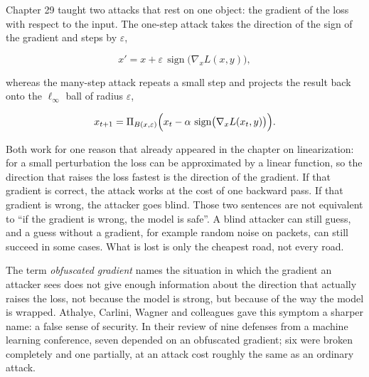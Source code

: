Chapter 29 taught two attacks that rest on one object: the gradient of the loss with respect to the
input. The one-step attack takes the direction of the sign of the gradient and steps by
$\varepsilon$,

\begin{equation}
x' = x + \varepsilon\,\operatorname{sign}\bigl(\nabla_x L(x,y)\bigr),
\end{equation}

whereas the many-step attack repeats a small step and projects the result back onto the
$\ell_\infty$ ball of radius $\varepsilon$,

\begin{equation}
x_{t+1} = \Pi_{B(x,\varepsilon)}\Bigl(x_t - \alpha\,\operatorname{sign}
\bigl(\nabla_x L(x_t,y)\bigr)\Bigr).
\end{equation}

Both work for one reason that already appeared in the chapter on linearization: for a small
perturbation the loss can be approximated by a linear function, so the direction that raises the loss
fastest is the direction of the gradient. If that gradient is correct, the attack works at the cost
of one backward pass. If that gradient is wrong, the attacker goes blind. Those two sentences are not
equivalent to ``if the gradient is wrong, the model is safe''. A blind attacker can still guess, and
a guess without a gradient, for example random noise on packets, can still succeed in some cases.
What is lost is only the cheapest road, not every road.

The term \emph{obfuscated gradient} names the situation in which the gradient an attacker sees does
not give enough information about the direction that actually raises the loss, not because the model
is strong, but because of the way the model is wrapped. Athalye, Carlini, Wagner and colleagues gave
this symptom a sharper name: a false sense of security. In their review of nine defenses from a
machine learning conference, seven depended on an obfuscated gradient; six were broken completely and
one partially, at an attack cost roughly the same as an ordinary attack.

